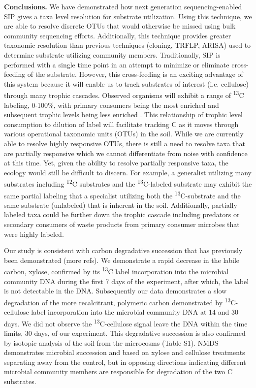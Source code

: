 \textbf{Conclusions.} We have demonstrated how next generation sequencing-enabled SIP gives a taxa level resolution for substrate utilization. Using this technique, we are able to resolve discrete OTUs that would otherwise be missed using bulk community sequencing efforts. Additionally, this technique provides greater taxonomic resolution than previous techniques (cloning, TRFLP, ARISA) used to determine substrate utilizing community members. Traditionally, SIP is performed with a single time point in an attempt to minimize or eliminate cross-feeding of the substrate.  However, this cross-feeding is an exciting advantage of this system because it will enable us to track substrates of interest (i.e. cellulose) through many trophic cascades. Observed organisms will exhibit a range of \textsuperscript{13}C labeling, 0-100\%, with primary consumers being the most enriched and subsequent trophic levels being less enriched \cite{Morris_2002,McDonald_2005,Ziegler_2005}. This relationship of trophic level consumption to dilution of label will facilitate tracking C as it moves through various operational taxonomic units (OTUs) in the soil. While we are currently able to resolve highly responsive OTUs, there is still a need to resolve taxa that are partially responsive which we cannot differentiate from noise with confidence at this time. Yet, given the ability to resolve partially responsive taxa, the ecology would still be difficult to discern. For example, a generalist utilizing many substrates including \textsuperscript{12}C substrates and the \textsuperscript{13}C-labeled substrate may exhibit the same partial labeling that a specialist utilizing both the \textsuperscript{13}C-substrate and the same substrate (unlabeled) that is inherent in the soil. Additionally, partially labeled taxa could be further down the trophic cascade including predators or secondary consumers of waste products from primary consumer microbes that were highly labeled.   

Our study is consistent with carbon degradative succession that has previously been demonstrated \cite{Bastian_2009} (more refs). We demonstrate a rapid decrease in the labile carbon, xylose, confirmed by its \textsuperscript{13}C label incorporation into the microbial community DNA during the first 7 days of the experiment, after which, the label is not detectable in the DNA. Subsequently our data demonstrates a slow degradation of the more recalcitrant, polymeric carbon demonstrated by \textsuperscript{13}C-cellulose label incorporation into the microbial community DNA at 14 and 30 days. We did not observe the \textsuperscript{13}C-cellulose signal leave the DNA within the time limits, 30 days, of our experiment. This degradative succession is also confirmed by isotopic analysis of the soil from the microcosms (Table S1). NMDS demonstrates microbial succession and based on xylose and cellulose treatments separating away from the control, but in opposing directions indicating different microbial community members are responsible for degradation of the two C substrates. 

